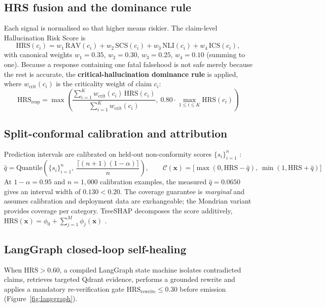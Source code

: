 \documentclass[11pt,a4paper]{article}
\begin{document}
\subsection{HRS fusion and the dominance rule}
Each signal is normalised so that higher means riskier. The claim-level Hallucination Risk Score is
\begin{equation}
\mathrm{HRS}(c_i)=w_1\,\mathrm{RAV}(c_i)+w_2\,\mathrm{SCS}(c_i)+w_3\,\mathrm{NLI}(c_i)+w_4\,\mathrm{ICS}(c_i),
\end{equation}
with canonical weights $w_1=0.35$, $w_2=0.30$, $w_3=0.25$, $w_4=0.10$ (summing to one). Because a response containing one fatal falsehood is not safe merely because the rest is accurate, the \textbf{critical-hallucination dominance rule} is applied, where $w_{\text{crit}}(c_i)$ is the criticality weight of claim $c_i$:
\begin{equation}
\mathrm{HRS}_{\text{resp}}=\max\!\left(\frac{\sum_{i=1}^{K}w_{\text{crit}}(c_i)\,\mathrm{HRS}(c_i)}{\sum_{i=1}^{K}w_{\text{crit}}(c_i)},\ 0.80\cdot\max_{1\le i\le K}\mathrm{HRS}(c_i)\right)
\end{equation}

\subsection{Split-conformal calibration and attribution}
Prediction intervals are calibrated on held-out non-conformity scores $\{s_i\}_{i=1}^n$ \cite{vovk2005,lei2018,angelopoulos2021}:
\begin{equation}
\hat q=\mathrm{Quantile}\!\left(\{s_i\}_{i=1}^{n},\ \frac{\lceil (n+1)(1-\alpha)\rceil}{n}\right),\qquad
\mathcal C(\mathbf x)=\big[\max(0,\mathrm{HRS}-\hat q),\ \min(1,\mathrm{HRS}+\hat q)\big]
\end{equation}
At $1-\alpha=0.95$ and $n=1{,}000$ calibration examples, the measured $\hat q=0.0650$ gives an interval width of $0.130<0.20$. The coverage guarantee is \emph{marginal} and assumes calibration and deployment data are exchangeable; the Mondrian variant provides coverage per category. TreeSHAP decomposes the score additively, $\mathrm{HRS}(\mathbf x)=\phi_0+\sum_{j=1}^{M}\phi_j(\mathbf x)$ \cite{lundberg2017,lundberg2020}.

\subsection{LangGraph closed-loop self-healing}
When $\mathrm{HRS}>0.60$, a compiled LangGraph state machine isolates contradicted claims, retrieves targeted Qdrant evidence, performs a grounded rewrite and applies a mandatory re-verification gate $\mathrm{HRS}_{\text{rewrite}}\le0.30$ before emission (Figure~\ref{fig:langgraph}).
\end{document}

